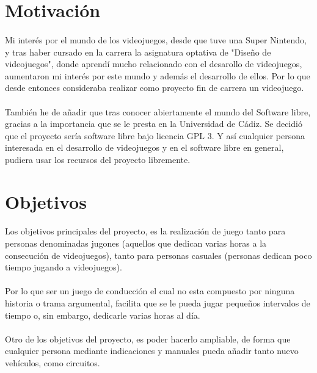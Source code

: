 \section{Motivación}

\paragraph{}
Mi interés por el mundo de los videojuegos, desde que tuve una Super Nintendo, y tras haber cursado en la carrera
la asignatura optativa de "Diseño de videojuegos", donde aprendí mucho relacionado con el desarollo de videojuegos,
aumentaron mi interés por este mundo y además el desarrollo de ellos. Por lo que desde entonces consideraba realizar 
como proyecto fin de carrera un videojuego.

\paragraph{}
También he de añadir que tras conocer abiertamente el mundo del Software libre, gracias a la importancia que se le presta
en la Universidad de Cádiz. Se decidió que el proyecto sería software libre bajo licencia GPL 3. Y así cualquier persona
interesada en el desarrollo de videojuegos y en el software libre en general, pudiera usar los recursos del proyecto
libremente.

\section{Objetivos}

\paragraph{}
Los objetivos principales del proyecto, es la realización de juego tanto para personas denominadas jugones (aquellos que
dedican varias horas a la consecución de videojuegos), tanto para personas casuales (personas dedican poco tiempo
jugando a videojuegos).

\paragraph{}
Por lo que ser un juego de conducción el cual no esta compuesto por ninguna historia o trama argumental, facilita que se le pueda
jugar pequeños intervalos de tiempo o, sin embargo, dedicarle varias horas al día.

\paragraph{}
Otro de los objetivos del proyecto, es poder hacerlo ampliable, de forma que cualquier persona mediante indicaciones y manuales
pueda añadir tanto nuevo vehículos, como circuitos.

